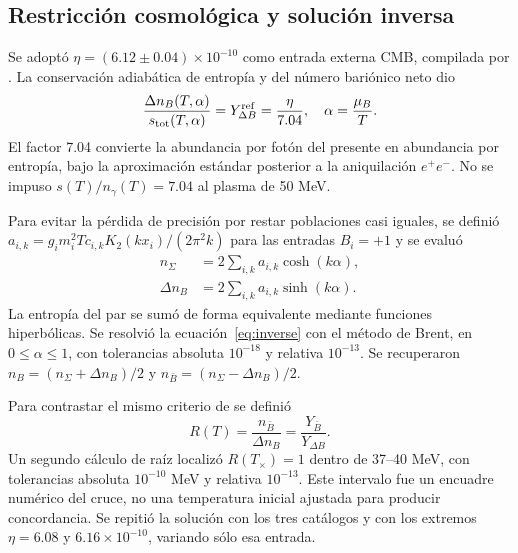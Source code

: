 \subsection{Restricción cosmológica y solución inversa}
Se adoptó $\eta=(6.12\pm0.04)\times10^{-10}$ como entrada externa CMB, compilada por \citet{Fields2025}. La conservación adiabática de entropía y del número bariónico neto dio
\begin{equation}
\frac{\Delta n_B(T,\alpha)}{s_{\rm tot}(T,\alpha)}
=Y_{\Delta B}^{\rm ref}=\frac{\eta}{7.04},
\quad\alpha=\frac{\mu_B}{T}.\label{eq:inverse}
\end{equation}
El factor 7.04 convierte la abundancia por fotón del presente en abundancia por entropía, bajo la aproximación estándar posterior a la aniquilación $e^+e^-$. No se impuso $s(T)/n_\gamma(T)=7.04$ al plasma de 50 MeV.

Para evitar la pérdida de precisión por restar poblaciones casi iguales, se definió $a_{i,k}=g_i m_i^2T c_{i,k}K_2(kx_i)/(2\pi^2k)$ para las entradas $B_i=+1$ y se evaluó
\begin{align}
n_\Sigma&=2\sum_{i,k}a_{i,k}\cosh(k\alpha),\nonumber\\
\Delta n_B&=2\sum_{i,k}a_{i,k}\sinh(k\alpha).\label{eq:stable}
\end{align}
La entropía del par se sumó de forma equivalente mediante funciones hiperbólicas. Se resolvió la ecuación~\eqref{eq:inverse} con el método de Brent, en $0\leq\alpha\leq1$, con tolerancias absoluta $10^{-18}$ y relativa $10^{-13}$. Se recuperaron $n_B=(n_\Sigma+\Delta n_B)/2$ y $n_{\bar B}=(n_\Sigma-\Delta n_B)/2$.

Para contrastar el mismo criterio de \citet{Yang2022} se definió
\begin{equation}
R(T)=\frac{n_{\bar B}}{\Delta n_B}
=\frac{Y_{\bar B}}{Y_{\Delta B}}.\label{eq:ratio}
\end{equation}
Un segundo cálculo de raíz localizó $R(T_\times)=1$ dentro de 37--40 MeV, con tolerancias absoluta $10^{-10}$ MeV y relativa $10^{-13}$. Este intervalo fue un encuadre numérico del cruce, no una temperatura inicial ajustada para producir concordancia. Se repitió la solución con los tres catálogos y con los extremos $\eta=6.08$ y $6.16\times10^{-10}$, variando sólo esa entrada.

